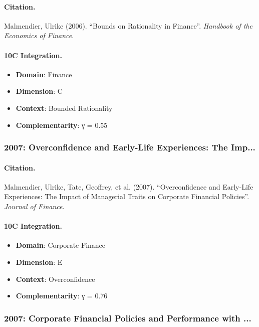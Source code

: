 \paragraph{Citation.}
Malmendier, Ulrike (2006). ``Bounds on Rationality in Finance''. \textit{Handbook of the Economics of Finance}.

\paragraph{10C Integration.}
\begin{itemize}[nosep]
  \item \textbf{Domain}: Finance
  \item \textbf{Dimension}: C
  \item \textbf{Context}: Bounded Rationality
  \item \textbf{Complementarity}: γ = 0.55
\end{itemize}


\subsubsection{2007: Overconfidence and Early-Life Experiences: The Imp...}

\paragraph{Citation.}
Malmendier, Ulrike, Tate, Geoffrey, et al. (2007). ``Overconfidence and Early-Life Experiences: The Impact of Managerial Traits on Corporate Financial Policies''. \textit{Journal of Finance}.

\paragraph{10C Integration.}
\begin{itemize}[nosep]
  \item \textbf{Domain}: Corporate Finance
  \item \textbf{Dimension}: E
  \item \textbf{Context}: Overconfidence
  \item \textbf{Complementarity}: γ = 0.76
\end{itemize}


\subsubsection{2007: Corporate Financial Policies and Performance with ...}

